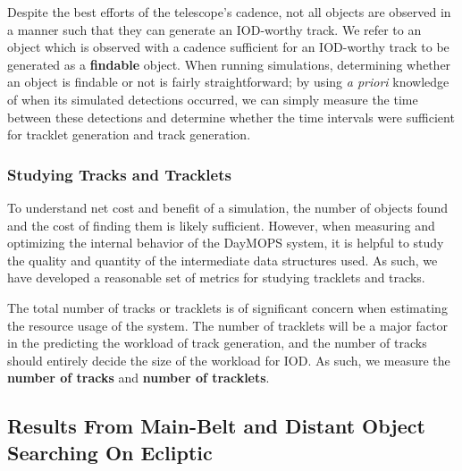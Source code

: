 \documentclass[12pt,preprint]{aastex}
\begin{document}
Despite the best efforts of the telescope's cadence, not all objects
are observed in a manner such that they can generate an IOD-worthy
track.  We refer to an object which is observed with a cadence
sufficient for an IOD-worthy track to be generated as a
\textbf{findable} object.  When running simulations, determining
whether an object is findable or not is fairly straightforward; by
using \textit{a priori} knowledge of when its simulated detections
occurred, we can simply measure the time between these detections and
determine whether the time intervals were sufficient for tracklet
generation and track generation.  


\subsubsection{Studying Tracks and Tracklets}

To understand net cost and benefit of a simulation, the number of
objects found and the cost of finding them is likely sufficient.
However, when measuring and optimizing the internal behavior of the
DayMOPS system, it is helpful to study the quality and quantity of the
intermediate data structures used. As such, we have developed a
reasonable set of metrics for studying tracklets and tracks.

The total number of tracks or tracklets is of significant concern when
estimating the resource usage of the system.  The number of tracklets
will be a major factor in the predicting the workload of track
generation, and the number of tracks should entirely decide the size
of the workload for IOD.  As such, we measure the \textbf{number of
  tracks} and \textbf{number of tracklets}.






\subsection{Results From Main-Belt and Distant Object Searching On Ecliptic}
\end{document}
